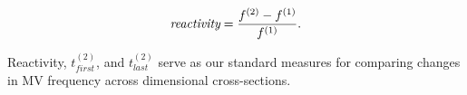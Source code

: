 \begin{equation}
  \mathrm{\emph{reactivity}} = \frac{f^{(2)} - f^{(1)}}{f^{(1)}}.
  \label{eq:reactivity}
\end{equation}
\noindent

Reactivity, $t^{(2)}_{first}$, and $t^{(2)}_{last}$ serve as our standard 
measures for comparing changes in MV frequency across dimensional cross-sections.


